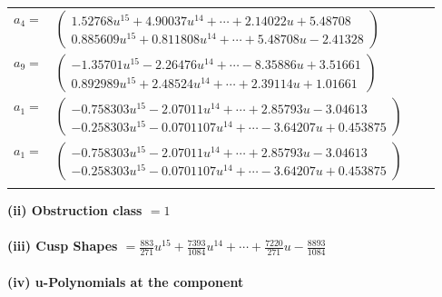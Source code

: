 \documentclass[1p]{elsarticle_modified}
\theoremstyle{definition}
\begin{document}
\begin{tabular}{m{7pt} m{180pt} m{7pt} m{180pt} }
\flushright $a_{4}=$&$\begin{pmatrix}1.52768 u^{15}+4.90037 u^{14}+\cdots+2.14022 u+5.48708\\0.885609 u^{15}+0.811808 u^{14}+\cdots+5.48708 u-2.41328\end{pmatrix}$ \\
\flushright $a_{9}=$&$\begin{pmatrix}-1.35701 u^{15}-2.26476 u^{14}+\cdots-8.35886 u+3.51661\\0.892989 u^{15}+2.48524 u^{14}+\cdots+2.39114 u+1.01661\end{pmatrix}$ \\
\flushright $a_{1}=$&$\begin{pmatrix}-0.758303 u^{15}-2.07011 u^{14}+\cdots+2.85793 u-3.04613\\-0.258303 u^{15}-0.0701107 u^{14}+\cdots-3.64207 u+0.453875\end{pmatrix}$\\ \flushright $a_{1}=$&$\begin{pmatrix}-0.758303 u^{15}-2.07011 u^{14}+\cdots+2.85793 u-3.04613\\-0.258303 u^{15}-0.0701107 u^{14}+\cdots-3.64207 u+0.453875\end{pmatrix}$\\&\end{tabular}
\flushleft \textbf{(ii) Obstruction class $= 1$}\\~\\
\flushleft \textbf{(iii) Cusp Shapes $= \frac{883}{271} u^{15}+\frac{7393}{1084} u^{14}+\cdots+\frac{7220}{271} u-\frac{8893}{1084}$}\\~\\
\newpage\renewcommand{\arraystretch}{1}
\flushleft \textbf{(iv) u-Polynomials at the component}\newline \\
\end{document}
